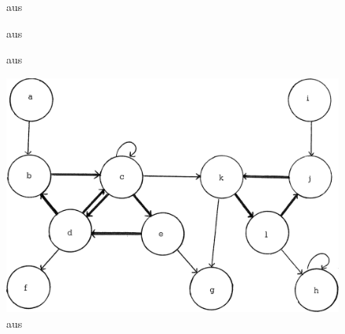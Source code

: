 \begin{figure}[H]
    \centering
    \setlength{\fboxsep}{10pt}\color{black!20}
    \normalcolor\caption{aus \citep[Seite 172]{gross2013handbook}}
\end{figure}

\begin{figure}[H]
    \centering
    \setlength{\fboxsep}{10pt}\color{black!20}
    \normalcolor\caption{aus \citep[Seite 172]{gross2013handbook}}
\end{figure}

\begin{figure}[H]
    \centering
    \setlength{\fboxsep}{10pt}\color{black!20}
    \normalcolor\caption{aus \citep[Seite 76f]{dar1993augmenting}}
\end{figure}

\newpage

\begin{figure}[H]
    \centering
    \includegraphics[width=.48\linewidth]{../img/purdom_g1.png}
    \caption{aus \citep[Seite 78]{purdom1970transitive}}
\end{figure}

